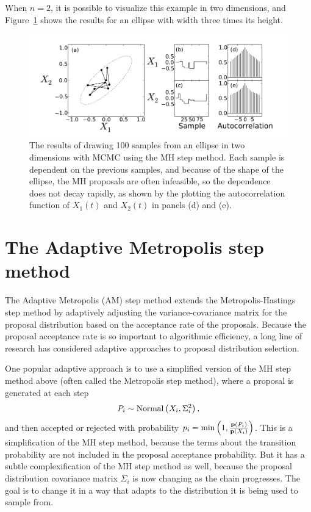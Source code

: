 When $n=2$, it is possible to visualize this example in two
dimensions, and Figure~\ref{metropolis-ball} shows the results for an
ellipse with width three times its height.

\begin{figure}[ht]
\begin{center}
\includegraphics[width=\textwidth]{metropolis-ball.pdf}
\caption{The results of drawing 100 samples from an ellipse in two
  dimensions with MCMC using the MH step method.  Each sample is
  dependent on the previous samples, and because of the shape of the
  ellipse, the MH proposals are often infeasible, so the dependence
  does not decay rapidly, as shown by the plotting the autocorrelation
  function of $X_1(t)$ and $X_2(t)$ in panels (d) and (e).}
\label{metropolis-ball}
\end{center}
\end{figure}


\section{The Adaptive Metropolis step method}
The Adaptive Metropolis (AM) step method extends the
Metropolis-Hastings step method by adaptively adjusting the
variance-covariance matrix for the proposal distribution based on the
acceptance rate of the proposals.\cite{Harrio_paper_cited_in_PyMC}
Because the proposal acceptance rate is so important to algorithmic
efficiency, a long line of research has considered adaptive approaches
to proposal distribution selection.\cite{refs_from_harrio_and_others}

One popular adaptive approach is to use a simplified version of the MH
step method above (often called the Metropolis step method), where a
proposal is generated at each step
\[
P_i \sim \operatorname{Normal}\left(X_i, \Sigma^2_i\right),
\]
and then accepted or rejected with probability $p_i = \min\left(1,
\frac{\mathbf{p}(P_i)}{\mathbf{p}(X_i)}\right)$.  This is a simplification of
the MH step method, because the terms about the transition probability
are not included in the proposal acceptance probability.  But it has a
subtle complexification of the MH step method as well, because the
proposal distribution covariance matrix $\Sigma_i$ is now changing
as the chain progresses.  The goal is to change it in a way that
adapts to the distribution it is being used to sample from.

